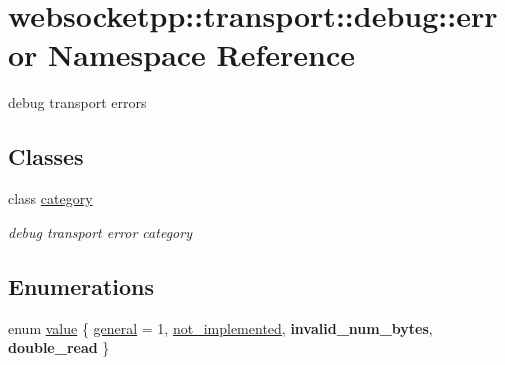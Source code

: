 \hypertarget{namespacewebsocketpp_1_1transport_1_1debug_1_1error}{}\section{websocketpp\+:\+:transport\+:\+:debug\+:\+:error Namespace Reference}
\label{namespacewebsocketpp_1_1transport_1_1debug_1_1error}


debug transport errors  


\subsection*{Classes}
\begin{DoxyCompactItemize}
\item 
class \mbox{\hyperlink{classwebsocketpp_1_1transport_1_1debug_1_1error_1_1category}{category}}
\begin{DoxyCompactList}\small\item\em debug transport error category \end{DoxyCompactList}\end{DoxyCompactItemize}
\subsection*{Enumerations}
\begin{DoxyCompactItemize}
\item 
enum \mbox{\hyperlink{namespacewebsocketpp_1_1transport_1_1debug_1_1error_a5ee6badaa3c5ebb600c4062394fac69c}{value}} \{ \mbox{\hyperlink{namespacewebsocketpp_1_1transport_1_1debug_1_1error_a5ee6badaa3c5ebb600c4062394fac69cad6cbd99e4f73d21c82b0bb9cf2648028}{general}} = 1, 
\mbox{\hyperlink{namespacewebsocketpp_1_1transport_1_1debug_1_1error_a5ee6badaa3c5ebb600c4062394fac69ca01d1c00e0b91aa7a9146a01ca5f9e709}{not\+\_\+implemented}}, 
{\bfseries invalid\+\_\+num\+\_\+bytes}, 
{\bfseries double\+\_\+read}
 \}
\end{DoxyCompactItemize}
